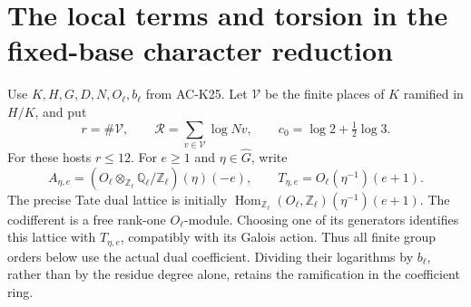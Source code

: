 \section{The local terms and torsion in the fixed-base character reduction}
\label{sec:fixed-base-local-terms}

Use \(K,H,G,D,N,O_\ell,b_\ell\) from AC-K25.
Let \(\mathcal V\) be the finite places of \(K\) ramified
in \(H/K\), and put
\[
 r=\#\mathcal V,\qquad
 \mathcal R=\sum_{v\in\mathcal V}\log Nv,\qquad
 c_0=\log2+\tfrac12\log3 .
 \tag{FL.1}
\]
For these hosts \(r\leq12\).
For \(e\geq1\) and \(\eta\in\widehat G\), write
\[
 A_{\eta,e}=(O_\ell\otimes_{\mathbb Z_\ell}
                  \mathbb Q_\ell/\mathbb Z_\ell)(\eta)(-e),
 \qquad
 T_{\eta,e}=O_\ell(\eta^{-1})(e+1).
 \tag{FL.2}
\]
The precise Tate dual lattice is initially
\(\operatorname{Hom}_{\mathbb Z_\ell}(O_\ell,\mathbb Z_\ell)
(\eta^{-1})(e+1)\).
The codifferent is a free rank-one \(O_\ell\)-module.
Choosing one of its generators identifies this lattice with
\(T_{\eta,e}\), compatibly with its Galois action.
Thus all finite group orders below use the actual dual
coefficient.  Dividing their logarithms by \(b_\ell\),
rather than by the residue degree alone, retains the
ramification in the coefficient ring.

